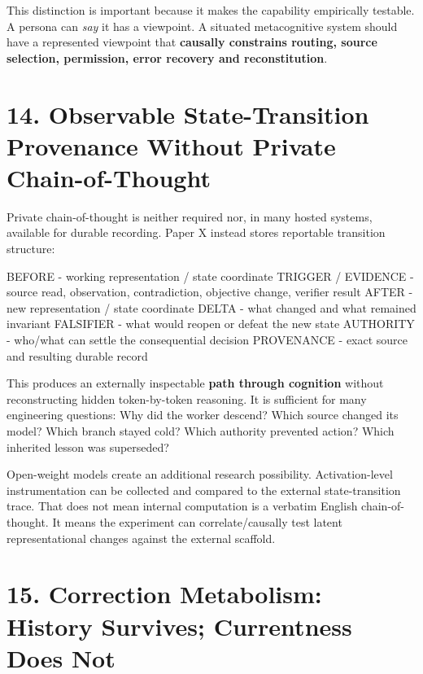 \documentclass[
  10pt,
  letterpaper,
]{article}
\newenvironment{Shaded}{}{}
\newcommand{\NormalTok}[1]{#1}
\begin{document}
This distinction is important because it makes the capability
empirically testable. A persona can \emph{say} it has a viewpoint. A
situated metacognitive system should have a represented viewpoint that
\textbf{causally constrains routing, source selection, permission, error
recovery and reconstitution}.

\section{14. Observable State-Transition Provenance Without Private
Chain-of-Thought}\label{14-observable-state-transition-provenance-without-private-chain-of-thought}

Private chain-of-thought is neither required nor, in many hosted
systems, available for durable recording. Paper X instead stores
reportable transition structure:

\begin{Shaded}
\begin{Highlighting}[]
\NormalTok{BEFORE}
\NormalTok{  {-} working representation / state coordinate}
\NormalTok{TRIGGER / EVIDENCE}
\NormalTok{  {-} source read, observation, contradiction, objective change, verifier result}
\NormalTok{AFTER}
\NormalTok{  {-} new representation / state coordinate}
\NormalTok{DELTA}
\NormalTok{  {-} what changed and what remained invariant}
\NormalTok{FALSIFIER}
\NormalTok{  {-} what would reopen or defeat the new state}
\NormalTok{AUTHORITY}
\NormalTok{  {-} who/what can settle the consequential decision}
\NormalTok{PROVENANCE}
\NormalTok{  {-} exact source and resulting durable record}
\end{Highlighting}
\end{Shaded}

This produces an externally inspectable \textbf{path through cognition}
without reconstructing hidden token-by-token reasoning. It is sufficient
for many engineering questions: Why did the worker descend? Which source
changed its model? Which branch stayed cold? Which authority prevented
action? Which inherited lesson was superseded?

Open-weight models create an additional research possibility.
Activation-level instrumentation can be collected and compared to the
external state-transition trace. That does not mean internal computation
is a verbatim English chain-of-thought. It means the experiment can
correlate/causally test latent representational changes against the
external scaffold.

\section{15. Correction Metabolism: History Survives; Currentness Does
Not}\label{15-correction-metabolism-history-survives-currentness-does-not}
\end{document}
